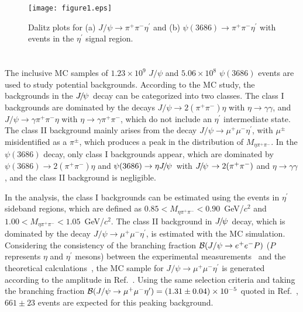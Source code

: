 \documentclass[twocolumn,showpacs,aps,prd]{revtex4-1}
\newcommand{\etap}{\eta^{\prime}}
\newcommand{\psip}{\psi(3686)}
\newcommand{\jpsidimu}{J/\psi\rightarrow\mu^{+} \mu^{-}\etap}
\begin{document}
\begin{figure}[tb]
\centering
   \texttt{[image: figure1.eps]}
  \caption{Dalitz plots for (a) $J/\psi\to\pi^+\pi^-\eta^\prime$ and (b) $\psi(3686) \to \pi^+\pi^-\eta^\prime$ with events in
  the $\eta^\prime$ signal region.}
\label{dalitz}
\end{figure}
%


\section{}\label{sectionbkg}

The inclusive MC samples of $1.23\times 10^9$ $J/\psi$ and $5.06\times 10^8$ $\psip$ events are used to study potential backgrounds. According to the MC study, the backgrounds in the $\jpsi$ decay can be categorized into two classes. The class I backgrounds are dominated by the decays $J/\psi\to 2(\pi^+\pi^-)\eta$ with $\eta\to \gamma\gamma$, and $J/\psi\to \gamma\pi^+\pi^-\eta$ with $\eta\to \gamma\pi^+\pi^-$, which do not include an $\etap$ intermediate state. The class II background mainly arises from the decay $\jpsidimu$, with $\mu^{\pm}$ misidentified as a $\pi^{\pm}$, which produces a peak in the distribution of $M_{\eta \pi^{+}\pi^{-}}$. In the $\psip$ decay, only class I backgrounds appear, which are dominated by $\psip \to 2(\pi^+\pi^-)\eta$ and $\psip \to \eta\jpsi$ with $\jpsi \to 2(\pi^+\pi^-)$ and $\eta\to \gamma\gamma$, and the class II background is negligible.

In the analysis, the class I
backgrounds can be estimated using the events in $\eta^\prime$ sideband regions, which are defined as $0.85<M_{\eta\pi^+\pi^-}<0.90$~GeV/$c^2$
and $1.00<M_{\eta\pi^+\pi^-}<1.05$~GeV/$c^2$.
The class II background in $\jpsi$ decay, which is dominated by the decay $\jpsidimu$, is estimated with the MC simulation. Considering the consistency of the branching fraction ${\cal B}(J/\psi\to
e^+e^-P)$ ($P$ represents $\eta$ and $\eta^\prime$ mesons) between the experimental measurements~\cite{chuxk} and
the theoretical calculations~\cite{jpsidimu}, the MC sample for $\jpsidimu$ is generated according to the amplitude in Ref.~\cite{jpsidimu}. Using the same selection criteria and taking the branching fraction ${\cal B}(J/\psi\to \mu^+\mu^-\eta^\prime) = (1.31\pm0.04)\times 10^{-5}$ quoted in Ref.~\cite{jpsidimu}, $661\pm23$ events are expected for this peaking background.
\end{document}

